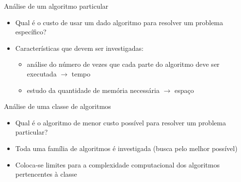 \begin{frame}[label=graduacao]
	Análise de um algoritmo particular
	\begin{itemize}
		\item Qual é o custo de usar um dado algoritmo para resolver um problema específico?
		\item Características que devem ser investigadas:
			\begin{itemize}
				\item análise do número de vezes que cada parte do algoritmo 
				deve ser executada $\rightarrow$ \alert<1>{tempo}
				\item estudo da quantidade de memória necessária $\rightarrow$ \alert<1>{espaço}
			\end{itemize}
	\end{itemize}
	\vfill\pause
	Análise de uma classe de algoritmos
	\begin{itemize}
		\item Qual é o algoritmo de menor custo possível para resolver um problema particular?
		\item Toda uma família de algoritmos é investigada (busca pelo melhor possível)
		\item Coloca-se limites para a complexidade computacional dos algoritmos pertencentes à classe
	\end{itemize}
\end{frame}

